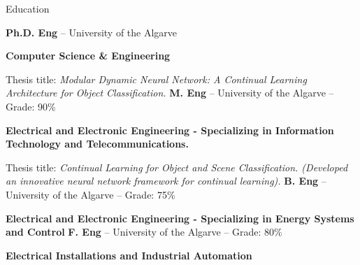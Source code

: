 \begin{rubric}{Education}


  \entry*[\texttt{2021 –- ...~~~~~~~~~}]
  \textbf{Ph.D. Eng} -- University of the Algarve

  \vspace{0.1cm}
  \par \textbf{Computer Science \& Engineering}

  \par Thesis title: \emph{ Modular Dynamic Neural Network: A Continual Learning Architecture for Object
    Classification.}
  \vspace{0.15cm}
  \entry*[\texttt{2018 -- 2020~~~~~~~~}]
  \textbf{M. Eng} -- University of the Algarve -- Grade: 90\%

  \vspace{0.1cm}
  \par \textbf{Electrical and Electronic Engineering - Specializing in Information Technology and
    Telecommunications.}

  \par Thesis title: \emph{ Continual Learning for Object and Scene Classification. (Developed an innovative
    neural network framework for continual learning).}
  \vspace{0.15cm}
  \entry*[\texttt{2015 -- 2018~~~~~~~~}]
  \textbf{B. Eng} -- University of the Algarve -- Grade: 75\%

  \vspace{0.1cm}
  \par \textbf{Electrical and Electronic Engineering - Specializing in Energy Systems and Control}
  \vspace{0.15cm}
  \entry*[\texttt{2013 -- 2015~~~~~~~~}]
  \textbf{F. Eng} -- University of the Algarve -- Grade: 80\%

  \vspace{0.1cm}
  \par \textbf{Electrical Installations and Industrial Automation}
  \vspace{0.15cm}

\end{rubric}